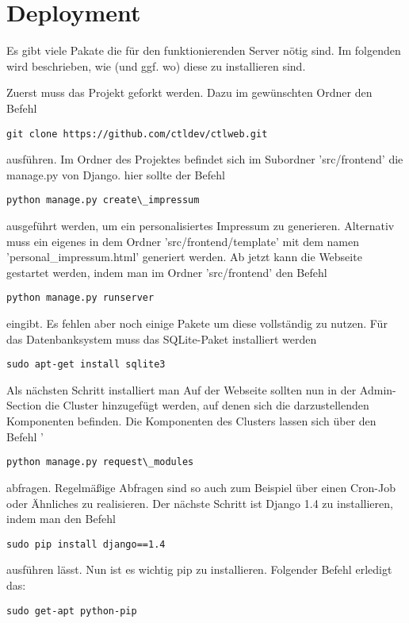 \chapter{Deployment}
Es gibt viele Pakate die für den funktionierenden Server nötig sind. Im folgenden wird beschrieben, wie (und ggf. wo) diese zu installieren sind. 


Zuerst muss das Projekt geforkt werden. Dazu im gewünschten Ordner den Befehl 
\begin{lstlisting}
git clone https://github.com/ctldev/ctlweb.git 
\end{lstlisting}
ausführen. Im Ordner des
Projektes befindet sich im Subordner 'src/frontend' die manage.py von Django.
hier sollte der Befehl 
\begin{lstlisting}
python manage.py create\_impressum
\end{lstlisting}
 ausgeführt werden, um ein personalisiertes Impressum zu generieren. Alternativ muss ein eigenes 
in dem Ordner 'src/frontend/template' mit dem namen
'personal\_impressum.html' generiert werden. Ab jetzt kann die Webseite gestartet
werden, indem man im Ordner 'src/frontend' den Befehl
\begin{lstlisting}
python manage.py runserver 
\end{lstlisting}
eingibt. Es fehlen aber noch einige Pakete um diese vollständig zu nutzen.
Für das Datenbanksystem muss das SQLite-Paket installiert werden
\begin{lstlisting}
sudo apt-get install sqlite3
\end{lstlisting}
Als nächsten Schritt installiert man 
Auf der Webseite sollten nun in der Admin-Section die Cluster hinzugefügt werden,
auf denen sich die darzustellenden Komponenten befinden. Die Komponenten des
Clusters lassen sich über den Befehl '
\begin{lstlisting}
python manage.py request\_modules
\end{lstlisting}
abfragen. Regelmäßige Abfragen sind so auch zum Beispiel über einen Cron-Job
oder Ähnliches zu realisieren.
\newpage
Der nächste Schritt ist Django 1.4 zu installieren, indem man den Befehl
\begin{lstlisting}
sudo pip install django==1.4
\end{lstlisting}
ausführen lässt. 
Nun ist es wichtig pip zu installieren. Folgender Befehl erledigt das:
\begin{lstlisting}
sudo get-apt python-pip
\end{lstlisting}
